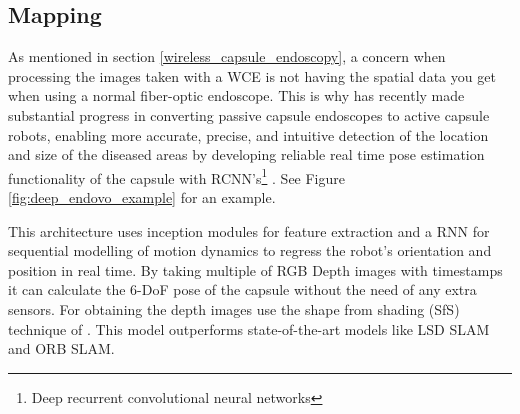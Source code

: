 \documentclass[english, a4paper]{article}
\begin{document}
\subsection{Mapping} \label{mapping}
As mentioned in section \ref{wireless_capsule_endoscopy}, a concern when processing the images taken with a WCE is not having the spatial data you get when using a normal fiber-optic endoscope. This is why \citeauthor*{DeepEndoVO18} has recently made substantial progress in converting passive capsule endoscopes to active capsule robots, enabling more accurate, precise, and intuitive detection of the location and size of the diseased areas by developing reliable real time pose estimation functionality of the capsule with RCNN's\footnote{Deep recurrent convolutional neural networks} \cite{DeepEndoVO18}. See Figure \ref{fig:deep_endovo_example} for an example.

This architecture uses inception modules for feature extraction and a RNN for sequential modelling of motion dynamics to regress the robot's orientation and position in real time. By taking multiple of RGB Depth images with timestamps it can calculate the 6-DoF pose of the capsule without the need of any extra sensors. For obtaining the depth images \citeauthor*{DeepEndoVO18} use the shape from shading (SfS) technique of \citeauthor{ShapeShading94} \cite{ShapeShading94}. This model outperforms state-of-the-art models like LSD SLAM and ORB SLAM.
\end{document}

